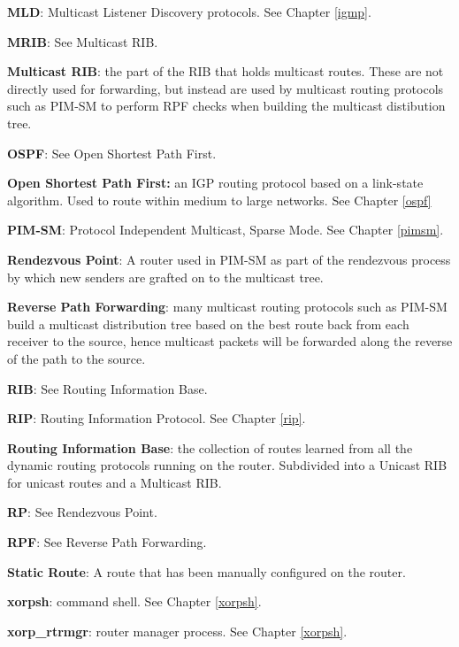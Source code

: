 \begin{description}
  \item{\bf MLD}: Multicast Listener Discovery protocols.  See Chapter
  \ref{igmp}.

  \item{\bf MRIB}: See Multicast RIB.

  \item{\bf Multicast RIB}: the part of the RIB that holds multicast routes.
  These are not directly used for forwarding, but instead are used by
  multicast routing protocols such as PIM-SM to perform RPF checks
  when building the multicast distibution tree.

  \item{\bf OSPF}: See Open Shortest Path First.

  \item{\bf Open Shortest Path First:} an IGP routing protocol based on
  a link-state algorithm.  Used to route within medium to large
networks. See Chapter \ref{ospf}

  \item{\bf PIM-SM}: Protocol Independent Multicast, Sparse Mode. See
  Chapter \ref{pimsm}.

  \item{\bf Rendezvous Point}: A router used in PIM-SM as part of the
  rendezvous process by which new senders are grafted on to the
  multicast tree.

  \item{\bf Reverse Path Forwarding}: many multicast routing protocols
  such as PIM-SM build a multicast distribution tree based on the best
  route back from each receiver to the source, hence multicast packets
  will be forwarded along the reverse of the path to the source.

  \item{\bf RIB}: See Routing Information Base.

  \item{\bf RIP}: Routing Information Protocol.  See Chapter \ref{rip}.

  \item{\bf Routing Information Base}: the collection of routes learned
  from all the dynamic routing protocols running on the router.
  Subdivided into a Unicast RIB for unicast routes and a Multicast RIB.

  \item{\bf RP}: See Rendezvous Point.

  \item{\bf RPF}: See Reverse Path Forwarding.

  \item{\bf Static Route}: A route that has been manually configured on
  the router.

  \item{\bf xorpsh}: \xorp command shell.  See Chapter \ref{xorpsh}.

  \item{\bf xorp\_rtrmgr}: \xorp router manager process.  See Chapter
  \ref{xorpsh}.

\end{description}

